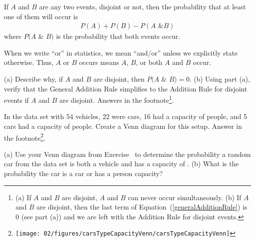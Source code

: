 \begin{termBox}{ If $A$ and $B$ are any two events, disjoint or not, then the probability that at least one of them will occur is
\begin{eqnarray}
P(A) + P(B) - P(A\text{ \& }B)
\label{generalAdditionRule}
\end{eqnarray}
where $P(A$ \& $B)$ is the probability that both events occur.}
\end{termBox}

\begin{tipBox}{
When we write ``or'' in statistics, we mean ``and/or'' unless we explicitly state otherwise. Thus, $A$ or $B$ occurs means $A$, $B$, or both $A$ and $B$ occur.}
\end{tipBox}

\begin{exercise}
(a) Describe why, if $A$ and $B$ are disjoint, then $P(A$ \& $B) = 0$. (b) Using part (a), verify that the General Addition Rule simplifies to the Addition Rule for disjoint events if $A$ and $B$ are disjoint. Answers in the footnote\footnote{(a) If $A$ and $B$ are disjoint, $A$ and $B$ can never occur simultaneously. (b) If $A$ and $B$ are disjoint, then the last term of Equation~(\ref{generalAdditionRule}) is 0 (see part (a)) and we are left with the Addition Rule for disjoint events.}.
\end{exercise}

\begin{exercise}\label{carsTypeCapacityVennExer}
In the  data set with 54 vehicles, 22 were  cars, 16 had a capacity of  people, and 5  cars had a capacity of  people. Create a Venn diagram for this setup. Answer in the footnote\footnote{\vspace{-3mm}

\noindent\texttt{[image: 02/figures/carsTypeCapacityVenn/carsTypeCapacityVenn]}}.
\end{exercise}

\begin{exercise}
(a) Use your Venn diagram from Exercise~ to determine the probability a random car from the  data set is both a  vehicle and has a capacity of . (b) What is the probability the car is a  car or has a  person capacity?
\end{exercise}


